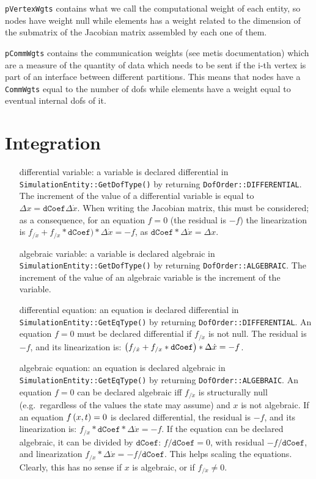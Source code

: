 \documentclass[10pt,dvips]{report}
\begin{document}
\texttt{pVertexWgts} 
contains what we call the computational weight of each entity, 
so nodes have weight null while elements has a weight related to 
the dimension of the submatrix of the Jacobian matrix assembled
by each one of them.

\texttt{pCommWgts} contains the communication weights 
(see metis documentation) which are a measure of the quantity 
of data which needs to be sent if the i-th vertex is part 
of an interface between different partitions. 
This means that nodes have a \texttt{CommWgts} equal to the number 
of dofs while elements have a weight equal to eventual internal dofs of it.


\chapter{Integration}

\begin{itemize}

\item[differential variable:] a variable is declared differential
in \texttt{SimulationEntity::GetDofType()} 
by returning \texttt{DofOrder::DIFFERENTIAL}.
The increment of the value of a differential variable is equal 
to $\Delta x=\texttt{dCoef}\Delta \dot{x}$.
When writing the Jacobian matrix, this must be considered;
as a consequence, for an equation $f=0$ (the residual is $-f$)
the linearization is 
$f_{/\dot{x}}+f_{/x}*\texttt{dCoef})*\Delta \dot{x}=-f$, 
as $\texttt{dCoef}*\Delta \dot{x}=\Delta x$.

\item[algebraic variable:] a variable is declared algebraic
in \texttt{SimulationEntity::GetDofType()}
by returning \texttt{DofOrder::ALGEBRAIC}.
The increment of the value of an algebraic variable is the increment 
of the variable.

\item[differential equation:] an equation is declared differential
in \texttt{SimulationEntity::GetEqType()}
by returning \texttt{DofOrder::DIFFERENTIAL}.
An equation $f=0$ must be declared differential if $f_{/\dot{x}}$ is not null.
The residual is $-f$, and its linearization is:
$\left( f_{/\dot{x}}+f_{/x}*\texttt{dCoef} \right)*\Delta \dot{x}=-f$.

\item[algebraic equation:] an equation is declared algebraic
in \texttt{SimulationEntity::GetEqType()}
by returning \texttt{DofOrder::ALGEBRAIC}.
An equation $f=0$ can be declared algebraic iff $f_{/\dot{x}}$ 
is structurally null (e.g.\ regardless of the values the state may assume) 
and $x$ is not algebraic.
If an equation $f\left( x,t \right)=0$ is declared differential,
the residual is $-f$, and its linearization is:
$f_{/x}*\texttt{dCoef}*\Delta \dot{x}=-f$.
If the equation can be declared algebraic, it can be divided by $\texttt{dCoef}$:
$f/\texttt{dCoef}=0$, with residual $-f/\texttt{dCoef}$,
and linearization $f_{/x}*\Delta \dot{x} = -f/\texttt{dCoef}$.
This helps scaling the equations.
Clearly, this has no sense if $x$ is algebraic,
or if $f_{/\dot{x}} \neq 0$.

\end{itemize}
\end{document}
